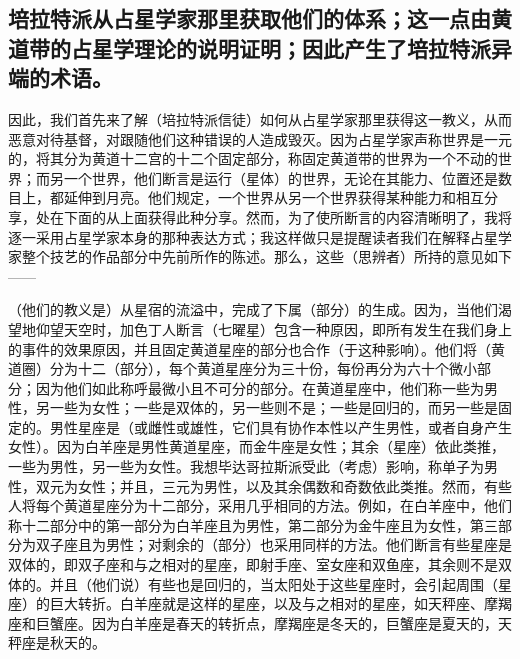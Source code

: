 
\subsection{培拉特派从占星学家那里获取他们的体系；这一点由黄道带的占星学理论的说明证明；因此产生了培拉特派异端的术语。}

因此，我们首先来了解（培拉特派信徒）如何从占星学家那里获得这一教义，从而恶意对待基督，对跟随他们这种错误的人造成毁灭。因为占星学家声称世界是一元的，将其分为黄道十二宫的十二个固定部分，称固定黄道带的世界为一个不动的世界；而另一个世界，他们断言是运行（星体）的世界，无论在其能力、位置还是数目上，都延伸到月亮。他们规定，一个世界从另一个世界获得某种能力和相互分享，处在下面的从上面获得此种分享。然而，为了使所断言的内容清晰明了，我将逐一采用占星学家本身的那种表达方式；我这样做只是提醒读者我们在解释占星学家整个技艺的作品部分中先前所作的陈述。那么，这些（思辨者）所持的意见如下——\par

（他们的教义是）从星宿的流溢中，完成了下属（部分）的生成。因为，当他们渴望地仰望天空时，加色丁人断言（七曜星）包含一种原因，即所有发生在我们身上的事件的效果原因，并且固定黄道星座的部分也合作（于这种影响）。他们将（黄道圈）分为十二（部分），每个黄道星座分为三十份，每份再分为六十个微小部分；因为他们如此称呼最微小且不可分的部分。在黄道星座中，他们称一些为男性，另一些为女性；一些是双体的，另一些则不是；一些是回归的，而另一些是固定的。男性星座是（或雌性或雄性，它们具有协作本性以产生男性，或者自身产生女性）。因为白羊座是男性黄道星座，而金牛座是女性；其余（星座）依此类推，一些为男性，另一些为女性。我想毕达哥拉斯派受此（考虑）影响，称单子为男性，双元为女性；并且，三元为男性，以及其余偶数和奇数依此类推。然而，有些人将每个黄道星座分为十二部分，采用几乎相同的方法。例如，在白羊座中，他们称十二部分中的第一部分为白羊座且为男性，第二部分为金牛座且为女性，第三部分为双子座且为男性；对剩余的（部分）也采用同样的方法。他们断言有些星座是双体的，即双子座和与之相对的星座，即射手座、室女座和双鱼座，其余则不是双体的。并且（他们说）有些也是回归的，当太阳处于这些星座时，会引起周围（星座）的巨大转折。白羊座就是这样的星座，以及与之相对的星座，如天秤座、摩羯座和巨蟹座。因为白羊座是春天的转折点，摩羯座是冬天的，巨蟹座是夏天的，天秤座是秋天的。\par

